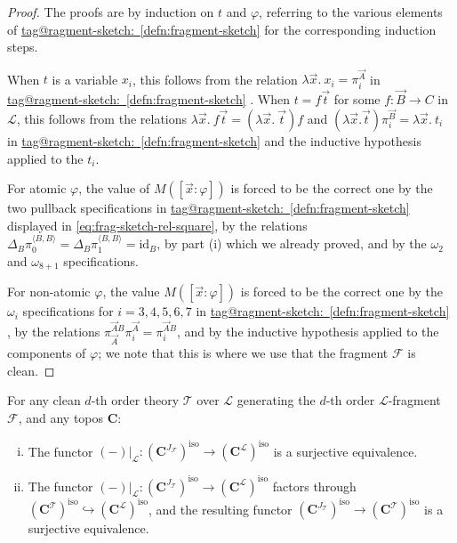 \documentclass{amsart}
\makeatletter
\newcommand\bC{\mathbf{C}}
\newcommand\br[1]{\langle{}#1\rangle{}}
\newcommand\cF{\mathcal{F}}
\newcommand\cL{\mathcal{L}}
\newcommand\cT{\mathcal{T}}
\newcommand\hto{\hookrightarrow}
\newcommand\id{\mathrm{id}}
\newcommand\iso{\mathrm{iso}}
\renewcommand\phi{\varphi}
\newcommand\rstr[2]{{\left.#1\right|_{#2}}}
\newcommand\vA{\vek{A}}
\newcommand\vB{\vek{B}}
\newcommand\vek[1]{{\vec{#1}}}
\newcommand\vt{\vek{t}}
\newcommand\vx{\vek{x}}
\newcommand\tagword[1]{\csname tag@#1\endcsname}
\def\label@tag#1:#2\@nil{#1}
\newcommand\labeltag[1]{\label@tag#1:\@nil}
\newcommand\jref[1]{%
  \texorpdfstring%
    {\hyperref[#1]{\tagword{\labeltag{#1}}~\ref*{#1}}}%
    {\tagword{\labeltag{#1}}~\ref*{#1}}%
}
\theoremstyle{definition}
\theoremstyle{remark}
\theoremstyle{plainwithref}
\makeatother
\begin{document}
\begin{proof}
  The proofs are by induction on \( t \) and \( \phi \), referring to the various elements of \jref{defn:fragment-sketch} for the corresponding induction steps.

  When \( t \) is a variable \( x_i \), this follows from the relation \( \lambda \vx.\ x_i = \pi_i^{\vA} \) in \jref{defn:fragment-sketch}.
  When \( t = f \vt \) for some \( f \colon \vB \to C \) in \( \cL \), this follows from the relations \( \lambda \vx.\ f \vt = (\lambda \vx.\ \vt) f \) and \( (\lambda \vx. \vt) \pi_i^{\vB} = \lambda \vx.\ t_i \) in \jref{defn:fragment-sketch} and the inductive hypothesis applied to the \( t_i \).

  For atomic \( \phi \), the value of \( M([\vx \colon \phi]) \) is forced to be the correct one by the two pullback specifications in \jref{defn:fragment-sketch} displayed in \eqref{eq:frag-sketch-rel-square}, by the relations \( \Delta_B \pi_0^{\br{B,B}} = \Delta_B \pi_1^{\br{B,B}} = \id_B \), by part (i) which we already proved, and by the \( \omega_2 \) and \( \omega_{8+1} \) specifications.

  For non-atomic \( \phi \), the value \( M([\vx \colon \phi]) \) is forced to be the correct one by the \( \omega_i \) specifications for \( i = 3,4,5,6,7 \) in \jref{defn:fragment-sketch}, by the relations \( \pi_{\vA}^{\vA B} \pi_i^{\vA} = \pi_i^{\vA B} \), and by the inductive hypothesis applied to the components of \( \phi \); we note that this is where we use that the fragment \( \cF \) is clean.
\end{proof}

\begin{propn} \label{propn:thy-sketch-surj-eq}
  For any clean \( d \)-th order theory \( \cT \) over \( \cL \) generating the \( d \)-th order \( \cL \)-fragment \( \cF \), and any topos \( \bC \):
  \begin{enumerate}[(i)]
  \item The functor \( \rstr{(-)}{\cL} \colon (\bC^{J_\cF})^\iso \to (\bC^{\cL})^\iso \) is a surjective equivalence.
  \item The functor \( \rstr{(-)}{\cL} \colon (\bC^{J_\cT})^\iso \to (\bC^{\cL})^\iso \) factors through \( (\bC^\cT)^\iso \hto (\bC^\cL)^\iso \), and the resulting functor \( (\bC^{J_{\cT}})^\iso \to (\bC^\cT)^\iso \) is a surjective equivalence.
  \end{enumerate}
\end{propn}
\end{document}
